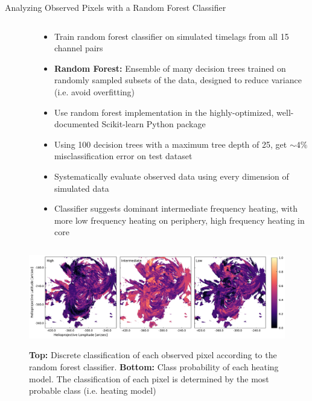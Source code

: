 \documentclass[final,12pt]{beamer}
\begin{document}
\begin{frame}
\begin{columns}[T]
\begin{column}{0.49\linewidth}
\begin{block}{Analyzing Observed Pixels with a Random Forest Classifier}
\begin{columns}[c]
\begin{column}{0.35\columnwidth}
\begin{figure}
          \end{figure}
        \end{column}
        \begin{column}{0.57\columnwidth}
          \begin{itemize}
            \item Train random forest classifier on simulated timelags from all 15 channel pairs
            \item \textbf{Random Forest:} Ensemble of many decision trees trained on randomly sampled subsets of the data, designed to reduce variance (i.e. avoid overfitting)
            \item Use random forest implementation in the highly-optimized, well-documented Scikit-learn Python package \citep{pedregosa_scikit-learn_2011}
            \item Using 100 decision trees with a maximum tree depth of 25, \alert{get $\sim4\%$ misclassification error} on test dataset
            \item \alert{Systematically evaluate observed data using every dimension of simulated data}
            \item Classifier suggests \alert{dominant intermediate frequency heating}, with more low frequency heating on periphery, high frequency heating in core
          \end{itemize}
        \end{column}
      \end{columns}
      \begin{figure}
        \includegraphics{../figures/class_probability_maps}
        \label{fig:probability_maps}
        \caption{\textbf{Top:} Discrete classification of each observed pixel according to the random forest classifier. \textbf{Bottom:} Class probability of each heating model. The classification of each pixel is determined by the most probable class (i.e. heating model)}
      \end{figure}
      \vspace{-2ex}
    \end{block}

\end{column}
\end{columns}
\end{frame}
\end{document}
